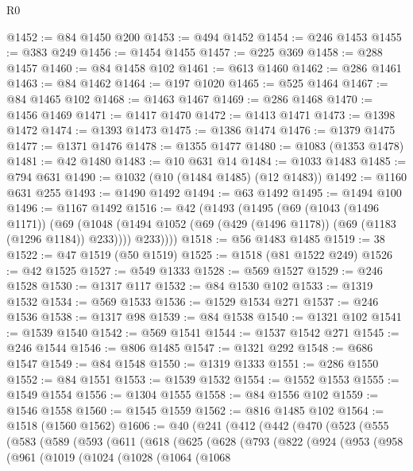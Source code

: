 \begin{lexlean}{R0}
\begin{coremodule}
@1452 := @84 @1450 @200
@1453 := @494 @1452
@1454 := @246 @1453
@1455 := @383 @249
@1456 := @1454 @1455
@1457 := @225 @369
@1458 := @288 @1457
@1460 := @84 @1458 @102
@1461 := @613 @1460
@1462 := @286 @1461
@1463 := @84 @1462
@1464 := @197 @1020
@1465 := @525 @1464
@1467 := @84 @1465 @102
@1468 := @1463 @1467
@1469 := @286 @1468
@1470 := @1456 @1469
@1471 := @1417 @1470
@1472 := @1413 @1471
@1473 := @1398 @1472
@1474 := @1393 @1473
@1475 := @1386 @1474
@1476 := @1379 @1475
@1477 := @1371 @1476
@1478 := @1355 @1477
@1480 := @1083 (@1353 @1478)
@1481 := @42 @1480
@1483 := @10 @631 @14
@1484 := @1033 @1483
@1485 := @794 @631
@1490 := @1032 (@10 (@1484 @1485) (@12 @1483))
@1492 := @1160 @631 @255
@1493 := @1490 @1492
@1494 := @63 @1492
@1495 := @1494 @100
@1496 := @1167 @1492
@1516 := @42
    (@1493
      (@1495
        (@69
          (@1043 (@1496 @1171))
          (@69
            (@1048 (@1494 @1052 (@69 (@429 (@1496 @1178)) (@69 (@1183 (@1296 @1184)) @233))))
            @233))))
@1518 := @56 @1483 @1485
@1519 := 38
@1522 := @47 @1519 (@50 @1519)
@1525 := @1518 (@81 @1522 @249)
@1526 := @42 @1525
@1527 := @549 @1333
@1528 := @569 @1527
@1529 := @246 @1528
@1530 := @1317 @117
@1532 := @84 @1530 @102
@1533 := @1319 @1532
@1534 := @569 @1533
@1536 := @1529 @1534 @271
@1537 := @246 @1536
@1538 := @1317 @98
@1539 := @84 @1538
@1540 := @1321 @102
@1541 := @1539 @1540
@1542 := @569 @1541
@1544 := @1537 @1542 @271
@1545 := @246 @1544
@1546 := @806 @1485
@1547 := @1321 @292
@1548 := @686 @1547
@1549 := @84 @1548
@1550 := @1319 @1333
@1551 := @286 @1550
@1552 := @84 @1551
@1553 := @1539 @1532
@1554 := @1552 @1553
@1555 := @1549 @1554
@1556 := @1304 @1555
@1558 := @84 @1556 @102
@1559 := @1546 @1558
@1560 := @1545 @1559
@1562 := @816 @1485 @102
@1564 := @1518 (@1560 @1562)
@1606 := @40
    (@241
      (@412
        (@442
          (@470
            (@523
              (@555
                (@583
                  (@589
                    (@593
                      (@611
                        (@618
                          (@625
                            (@628
                              (@793
                                (@822
                                  (@924
                                    (@953
                                      (@958
                                        (@961
                                          (@1019
                                            (@1024
                                              (@1028
                                                (@1064
                                                  (@1068

\end{coremodule}
\end{lexlean}
